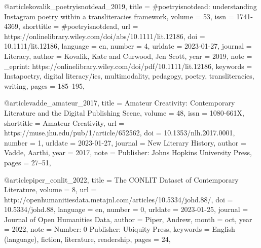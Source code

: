 
@article{kovalik_poetryisnotdead_2019,
	title = {\#poetryisnotdead: understanding {Instagram} poetry within a transliteracies framework},
	volume = {53},
	issn = {1741-4369},
	shorttitle = {\#poetryisnotdead},
	url = {https://onlinelibrary.wiley.com/doi/abs/10.1111/lit.12186},
	doi = {10.1111/lit.12186},
	language = {en},
	number = {4},
	urldate = {2023-01-27},
	journal = {Literacy},
	author = {Kovalik, Kate and Curwood, Jen Scott},
	year = {2019},
	note = {\_eprint: https://onlinelibrary.wiley.com/doi/pdf/10.1111/lit.12186},
	keywords = {Instapoetry, digital literacy/ies, multimodality, pedagogy, poetry, transliteracies, writing},
	pages = {185--195},
}

@article{vadde_amateur_2017,
	title = {Amateur {Creativity}: {Contemporary} {Literature} and the {Digital} {Publishing} {Scene}},
	volume = {48},
	issn = {1080-661X},
	shorttitle = {Amateur {Creativity}},
	url = {https://muse.jhu.edu/pub/1/article/652562},
	doi = {10.1353/nlh.2017.0001},
	number = {1},
	urldate = {2023-01-27},
	journal = {New Literary History},
	author = {Vadde, Aarthi},
	year = {2017},
	note = {Publisher: Johns Hopkins University Press},
	pages = {27--51},
}

@article{piper_conlit_2022,
	title = {The {CONLIT} {Dataset} of {Contemporary} {Literature}},
	volume = {8},
	url = {http://openhumanitiesdata.metajnl.com/articles/10.5334/johd.88/},
	doi = {10.5334/johd.88},
	language = {en},
	number = {0},
	urldate = {2023-01-25},
	journal = {Journal of Open Humanities Data},
	author = {Piper, Andrew},
	month = oct,
	year = {2022},
	note = {Number: 0
Publisher: Ubiquity Press},
	keywords = {English (language), fiction, literature, readership},
	pages = {24},
}
